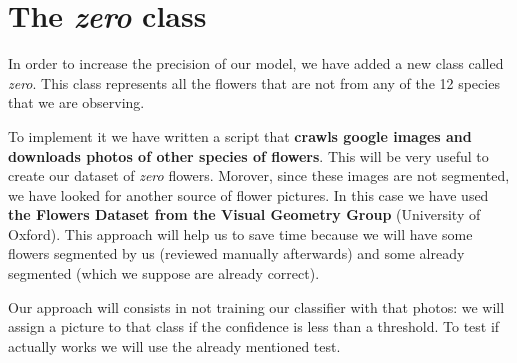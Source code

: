 \documentclass[11]{article}
\begin{document}
\section{The \textit{zero} class}

In order to increase the precision of our model, we have added a new class called \textit{zero}. This class represents all the flowers that are not from any of the 12 species that we are observing.
\medskip

To implement it we have written a script that \textbf{crawls google images and downloads photos of other species of flowers}. This will be very useful to create our dataset of \textit{zero} flowers. Morover, since these images are not segmented, we have looked for another source of flower pictures. In this case we have used \textbf{the Flowers Dataset from the Visual Geometry Group} (University of Oxford)\cite{Flower dataset}. This approach will help us to save time because we will have some flowers segmented by us (reviewed manually afterwards) and some already segmented (which we suppose are already correct).
\medskip

Our approach will consists in not training our classifier with that photos: we will assign a picture to that class if the confidence is less than a threshold. To test if actually works we will use the already mentioned test. 
\end{document}
